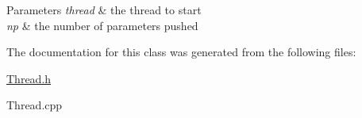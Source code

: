 \begin{DoxyParams}{Parameters}
{\em thread} & the thread to start \\
\hline
{\em np} & the number of parameters pushed \\
\hline
\end{DoxyParams}


The documentation for this class was generated from the following files\-:\begin{DoxyCompactItemize}
\item 
\hyperlink{a00149}{Thread.\-h}\item 
Thread.\-cpp\end{DoxyCompactItemize}
